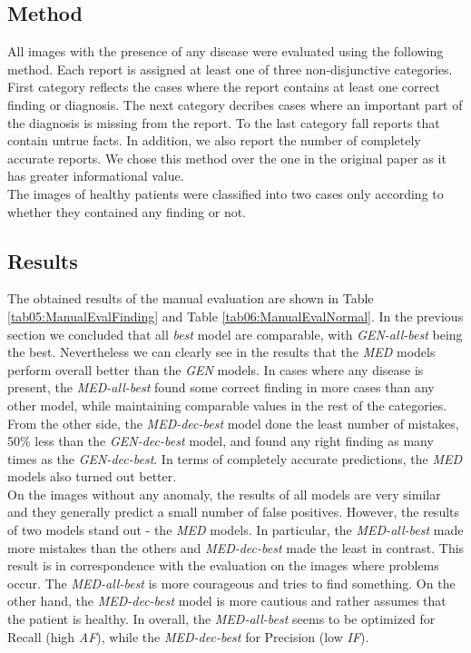 \subsection{Method}
All images with the presence of any disease were evaluated using the following method. Each report is assigned at least one of three non-disjunctive categories. First category reflects the cases where the report contains at least one correct finding or diagnosis. The next category decribes cases where an important part of the diagnosis is missing from the report. To the last category fall reports that contain untrue facts. In addition, we also report the number of completely accurate reports. We chose this method over the one in the original paper as it has greater informational value.\\

The images of healthy patients were classified into two cases only according to whether they contained any finding or not.

\subsection{Results}
The obtained results of the manual evaluation are shown in Table \ref{tab05:ManualEvalFinding} and Table \ref{tab06:ManualEvalNormal}. In the previous section we concluded that all \textit{best} model are comparable, with \textit{GEN-all-best} being the best. Nevertheless we can clearly see in the results that the  \textit{MED} models perform overall better than the \textit{GEN} models. In cases where any disease is present, the \textit{MED-all-best} found some correct finding in more cases than any other model, while maintaining comparable values in the rest of the categories. From the other side, the \textit{MED-dec-best} model done the least number of mistakes, 50\% less than the \textit{GEN-dec-best} model, and found any right finding as many times as the \textit{GEN-dec-best}. In terms of completely accurate predictions, the \textit{MED} models also turned out better.\\

On the images without any anomaly, the results of all models are very similar and they generally predict a small number of false positives. However, the results of two models stand out - the \textit{MED} models. In particular, the \textit{MED-all-best} made more mistakes than the others and \textit{MED-dec-best} made the least in contrast. This result is in correspondence with the evaluation on the images where problems occur. The \textit{MED-all-best} is more courageous and tries to find something. On the other hand, the \textit{MED-dec-best} model is more cautious and rather assumes that the patient is healthy. In overall, the \textit{MED-all-best} seems to be optimized for Recall (high \textit{AF}), while the \textit{MED-dec-best} for Precision (low \textit{IF}).\\

